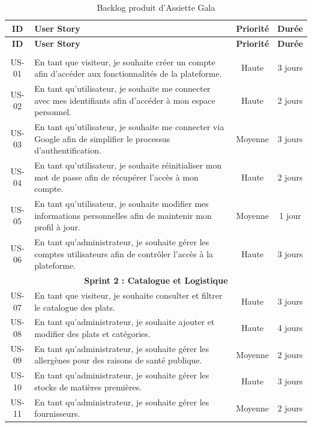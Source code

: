 \begin{longtable}{|c|p{7cm}|c|c|}
    \caption{Backlog produit d'Assiette Gala} \label{tab:backlog} \\
    \hline
    \textbf{ID} & \textbf{User Story} & \textbf{Priorité} & \textbf{Durée} \\
    \hline
    \endfirsthead
    \hline
    \textbf{ID} & \textbf{User Story} & \textbf{Priorité} & \textbf{Durée} \\
    \hline
    \endhead
    \hline
    \endfoot

    \multicolumn{4}{|c|}{\textbf{Sprint 1 : Gestion des utilisateurs}} \\
    \hline
    US-01 & En tant que visiteur, je souhaite créer un compte afin d'accéder aux fonctionnalités de la plateforme. & Haute & 3 jours \\
    \hline
    US-02 & En tant qu'utilisateur, je souhaite me connecter avec mes identifiants afin d'accéder à mon espace personnel. & Haute & 2 jours \\
    \hline
    US-03 & En tant qu'utilisateur, je souhaite me connecter via Google afin de simplifier le processus d'authentification. & Moyenne & 3 jours \\
    \hline
    US-04 & En tant qu'utilisateur, je souhaite réinitialiser mon mot de passe afin de récupérer l'accès à mon compte. & Haute & 2 jours \\
    \hline
    US-05 & En tant qu'utilisateur, je souhaite modifier mes informations personnelles afin de maintenir mon profil à jour. & Moyenne & 1 jour \\
    \hline
    US-06 & En tant qu'administrateur, je souhaite gérer les comptes utilisateurs afin de contrôler l'accès à la plateforme. & Haute & 3 jours \\
    \hline

    \multicolumn{4}{|c|}{\textbf{Sprint 2 : Catalogue et Logistique}} \\
    \hline
    US-07 & En tant que visiteur, je souhaite consulter et filtrer le catalogue des plats. & Haute & 3 jours \\
    \hline
    US-08 & En tant qu'administrateur, je souhaite ajouter et modifier des plats et catégories. & Haute & 4 jours \\
    \hline
    US-09 & En tant qu'administrateur, je souhaite gérer les allergènes pour des raisons de santé publique. & Moyenne & 2 jours \\
    \hline
    US-10 & En tant qu'administrateur, je souhaite gérer les stocks de matières premières. & Haute & 3 jours \\
    \hline
    US-11 & En tant qu'administrateur, je souhaite gérer les fournisseurs. & Moyenne & 2 jours \\
    \hline


\end{longtable}

